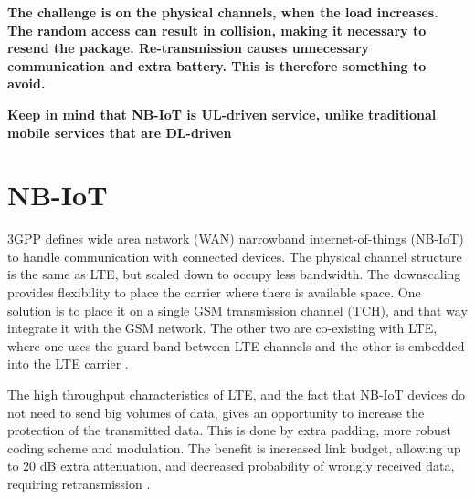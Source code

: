 \documentclass[10pt,a4paper,titlepage,twoside]{article}
\newcommand{\point}[1]{\textbf{\color{ymared} #1}}
\begin{document}


\vspace{2cm}

\point{The challenge is on the physical channels, when the load increases. The random access can result in collision, making it necessary to resend the package. Re-transmission causes unnecessary communication and extra battery. This is therefore something to avoid.}

\point{Keep in mind that NB-IoT is UL-driven service, unlike traditional mobile services that are DL-driven}

\clearpage
\section{NB-IoT}

3GPP defines wide area network (WAN) narrowband internet-of-things (NB-IoT) to handle communication with connected devices. The physical channel structure is the same as LTE, but scaled down to occupy less bandwidth. The downscaling provides flexibility to place the carrier where there is available space. One solution is to place it on a single  GSM transmission channel (TCH), and that way integrate it with the GSM network. The other two are co-existing with LTE, where one uses the guard band between LTE channels and the other is embedded into the LTE carrier \cite{schlienz}.

The high throughput characteristics of LTE, and the fact that NB-IoT devices do not need to send big volumes of data, gives an opportunity to increase the protection of the transmitted data. This is done by extra padding, more robust coding scheme and modulation. The benefit is increased link budget, allowing up to 20 dB extra attenuation, and decreased probability of wrongly received data, requiring retransmission \cite{wang}.
\end{document}
